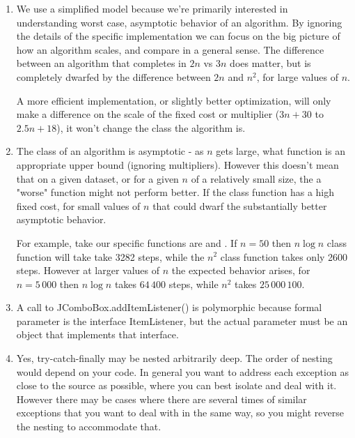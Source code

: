 \documentclass[12pt]{chmullighw}
\begin{document}
\begin{enumerate}

\item We use a simplified model because we're primarily interested in
understanding worst case, asymptotic behavior of an algorithm. By ignoring the
details of the specific implementation we can focus on the big picture of how an
algorithm scales, and compare in a general sense. The difference between an algorithm
that completes in $2n$ vs $3n$ does matter, but is completely dwarfed by the
difference between $2n$ and $n^2$, for large values of $n$. 

A more efficient implementation, or slightly better optimization, will only make
a difference on the scale of the fixed cost or multiplier ($3n+30$ to $2.5n+18$),
it won't change the class the algorithm is.


\item The class of an algorithm is asymptotic - as $n$ gets large, what function
is an appropriate upper bound (ignoring multipliers). However this doesn't mean
that on a given dataset, or for a given $n$ of a relatively small size, the
a "worse" function might not perform better. If the  class function
has a high fixed cost, for small values of $n$ that could dwarf the substantially
better asymptotic behavior. 

For example, take our specific functions are  and
. If $n = 50$ then $n \log n$ class function will take take
3282 steps, while the $n^2$ class function takes only 2600 steps. However at
larger values of $n$ the expected behavior arises, for $n = 5\,000$ then $n \log n$
takes $64\,400$ steps, while $n^2$ takes $25\,000\,100$.




\item A call to JComboBox.addItemListener() is polymorphic because
formal parameter is the interface ItemListener, but the actual parameter must be an object that implements that interface.

\item Yes, try-catch-finally may be nested arbitrarily deep. The order of nesting would depend on your code. In general you want to address each exception as close to the source as possible, where you can best isolate and deal with it. However there may be cases where there are several times of similar exceptions that you want to deal with in the same way, so you might reverse the nesting to accommodate that.




\end{enumerate}
\end{document}
